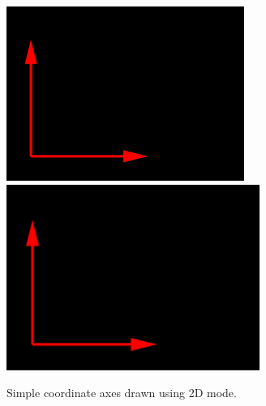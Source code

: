 \begin{figure}[t]
\begin{center}
\iflatexml
 \includegraphics[]{images/arrowFrame}
\else
 \includegraphics[width=3.25in]{images/arrowFrame}
\fi
\end{center}
\caption{Simple coordinate axes drawn using 2D mode.}
\label{arrowFrame:fig}
\end{figure}
%

